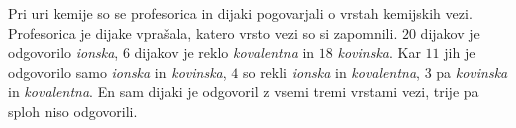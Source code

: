 \documentclass[addpoints]{exam}
\begin{document}
\begin{questions}







    
    \question
    Pri uri kemije so se profesorica in dijaki pogovarjali o vrstah kemijskih vezi.  Profesorica je dijake vprašala, katero vrsto vezi so si zapomnili.
    $20$ dijakov je odgovorilo \textit{ionska}, $6$ dijakov je reklo \textit{kovalentna} in $18$ \textit{kovinska}. Kar $11$ jih je odgovorilo samo \textit{ionska} in \textit{kovinska}, $4$ so rekli \textit{ionska} in \textit{kovalentna},
    $3$ pa \textit{kovinska} in \textit{kovalentna}. En sam dijaki je odgovoril z vsemi tremi vrstami vezi, trije pa sploh niso odgovorili. 


\end{questions}
\end{document}
